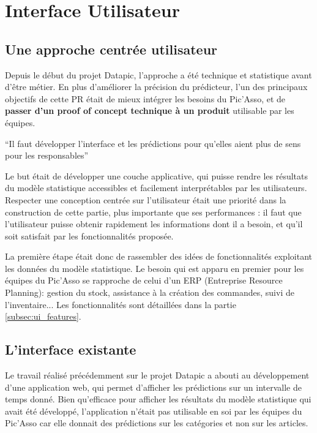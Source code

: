 \section{Interface Utilisateur}
\label{sec:interface}

\subsection{Une approche centrée utilisateur}
Depuis le début du projet Datapic, l’approche a été technique et statistique avant d’être métier. En plus d’améliorer la précision du prédicteur, l’un des principaux objectifs de cette PR était de mieux intégrer les besoins du Pic’Asso, et de \textbf{passer d’un proof of concept technique à un produit} utilisable par les équipes.

“Il faut développer l’interface et les prédictions pour qu’elles aient plus de sens pour les responsables”

Le but était de développer une couche applicative, qui puisse rendre les résultats du modèle statistique accessibles et facilement interprétables par les utilisateurs. Respecter une conception centrée sur l'utilisateur était une priorité dans la construction de cette partie, plus importante que ses performances : il faut que l'utilisateur puisse obtenir rapidement les informations dont il a besoin, et qu'il soit satisfait par les fonctionnalités proposée.

La première étape était donc de rassembler des idées de fonctionnalités exploitant les données du modèle statistique. Le besoin qui est apparu en premier pour les équipes du Pic'Asso se rapproche de celui d'un ERP (Entreprise Resource Planning): gestion du stock, assistance à la création des commandes, suivi de l'inventaire... Les fonctionnalités sont détaillées dans la partie \ref{subsec:ui_features}.

\subsection{L'interface existante}
\label{subsec:current_ui}

Le travail réalisé précédemment sur le projet Datapic a abouti au développement d'une application web, qui permet d'afficher les prédictions sur un intervalle de temps donné. Bien qu'efficace pour afficher les résultats du modèle statistique qui avait été développé, l'application n'était pas utilisable en soi par les équipes du Pic’Asso car elle donnait des prédictions sur les catégories et non sur les articles.

